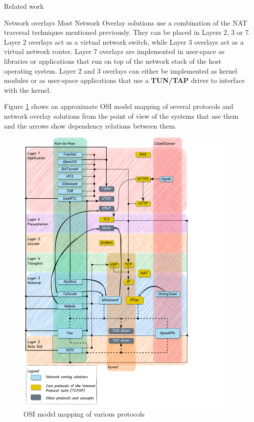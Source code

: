 \begin{frame}[fragile]{Related work}
\begin{block}{Network overlays}
\protect\hypertarget{thesis__020-related-work.md__network-overlays}{}
Most Network Overlay solutions use a combination of the NAT traversal
techniques mentioned previously. They can be placed in Layers 2, 3 or 7.
Layer 2 overlays act as a virtual network switch, while Layer 3 overlays
act as a virtual network router. Layer 7 overlays are implemented in
user-space as libraries or applications that run on top of the network
stack of the host operating system. Layer 2 and 3 overlays can either be
implemented as kernel modules or as user-space applications that use a
\textbf{TUN/TAP} driver to interface with the kernel.

Figure \ref{osi-map-overlays} shows an approximate OSI model mapping of
several protocols and network overlay solutions from the point of view
of the systems that use them and the arrows show dependency relations
between them.

\begin{figure}
\centering
\includegraphics[width=\textwidth,height=0.9\textheight]{thesis/../figures/osi-map-overlays.drawio.pdf}
\caption{OSI model mapping of various protocols
\label{osi-map-overlays}}
\end{figure}


\end{block}
\end{frame}
